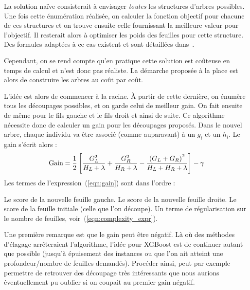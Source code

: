 La solution naïve consisterait à envisager \textit{toutes} les structures d'arbres possibles. Une fois cette énumération réalisée, on calculer la fonction objectif pour chacune de ces structures et on trouve ensuite celle fournissant la meilleure valeur pour l'objectif. Il resterait alors à optimiser les poids des feuilles pour cette structure. Des formules adaptées à ce cas existent et sont détaillées dans~\cite{bib:xgboost_article}.

Cependant, on se rend compte qu'en pratique cette solution est coûteuse en temps de calcul et n'est donc pas réaliste. La démarche proposée à la place est alors de construire les arbres au coût par coût.

L'idée est alors de commencer à la racine. À partir de cette dernière, on énumère tous les découpages possibles, et on garde celui de meilleur gain. On fait ensuite de même pour le fils gauche et le fils droit et ainsi de suite. Ce algorithme nécessite donc de calculer un gain pour les découpages proposés. Dans le nouvel arbre, chaque individu va être associé (comme auparavant) à un $g_i$ et un $h_i$. Le gain s'écrit alors :
\begin{equation}
\textnormal{Gain}=\frac{1}{2}\left[\frac{G_L^2}{H_L+\lambda}+\frac{G_R^2}{H_R+\lambda}-\frac{\left(G_L+G_R\right)^2}{H_L+H_R+\lambda}\right]-\gamma
\label{eqn:gain}
\end{equation}
Les termes de l'expression~(\ref{eqn:gain}) sont dans l'ordre :\begin{itemize}
	\itemperso{}Le score de la nouvelle feuille gauche.
	\itemperso{}Le score de la nouvelle feuille droite.
	\itemperso{}Le score de la feuille initiale (celle que l'on découpe).
	\itemperso{}Un terme de régularisation sur le nombre de feuilles, voir~(\ref{eqn:complexity_expr}).
\end{itemize}
Une première remarque est que le gain peut être négatif. Là où des méthodes d'élagage arrêteraient l'algorithme, l'idée pour XGBoost est de continuer autant que possible (jusqu'à épuisement des instances ou que l'on ait atteint une profondeur/nombre de feuilles demandés). Procéder ainsi, peut par exemple permettre de retrouver des découpage très intéressants que nous aurions éventuellement pu oublier si on coupait au premier gain négatif.


